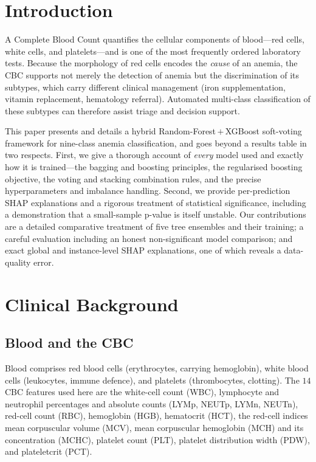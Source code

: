 \documentclass[conference]{IEEEtran}
\begin{document}
\section{Introduction}
A Complete Blood Count quantifies the cellular components of blood---red cells,
white cells, and platelets---and is one of the most frequently ordered laboratory
tests. Because the morphology of red cells encodes the \emph{cause} of an anemia,
the CBC supports not merely the detection of anemia but the discrimination of its
subtypes, which carry different clinical management (iron supplementation, vitamin
replacement, hematology referral). Automated multi-class classification of these
subtypes can therefore assist triage and decision support.

This paper presents and details a hybrid Random-Forest\,$+$\,XGBoost soft-voting
framework for nine-class anemia classification, and goes beyond a results table in
two respects. First, we give a thorough account of \emph{every} model used and
exactly how it is trained---the bagging and boosting principles, the regularised
boosting objective, the voting and stacking combination rules, and the precise
hyperparameters and imbalance handling. Second, we provide per-prediction SHAP
explanations and a rigorous treatment of statistical significance, including a
demonstration that a small-sample p-value is itself unstable. Our contributions are
a detailed comparative treatment of five tree ensembles and their training; a
careful evaluation including an honest non-significant model comparison; and exact
global and instance-level SHAP explanations, one of which reveals a data-quality
error.

\section{Clinical Background}
\subsection{Blood and the CBC}
Blood comprises red blood cells (erythrocytes, carrying hemoglobin), white blood
cells (leukocytes, immune defence), and platelets (thrombocytes, clotting). The
$14$ CBC features used here are the white-cell count (WBC), lymphocyte and
neutrophil percentages and absolute counts (LYMp, NEUTp, LYMn, NEUTn), red-cell
count (RBC), hemoglobin (HGB), hematocrit (HCT), the red-cell indices mean
corpuscular volume (MCV), mean corpuscular hemoglobin (MCH) and its concentration
(MCHC), platelet count (PLT), platelet distribution width (PDW), and plateletcrit
(PCT).
\end{document}
